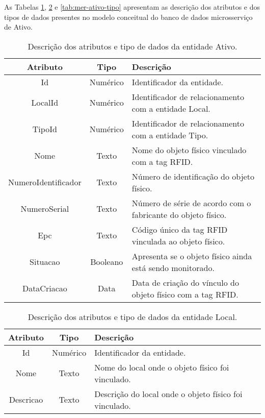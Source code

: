 \newpage

As Tabelas \ref{tab:mer-ativo}, \ref{tab:mer-ativo-local} e \ref{tab:mer-ativo-tipo} apresentam as descrição dos atributos e dos tipos de dados presentes no modelo conceitual do banco de dados microsserviço de Ativo.

\begin{table}[htb!]
\caption{Descrição dos atributos e tipo de dados da entidade Ativo.}
\label{tab:mer-ativo}
\begin{tabular}
{| c | c | p{9cm} |}
\hline 
\textbf{Atributo} & \textbf{Tipo} & \textbf{Descrição} \\ \hline
Id & Numérico & Identificador da entidade. \\ \hline
LocalId & Numérico & Identificador de relacionamento com a entidade Local. \\ \hline
TipoId & Numérico & Identificador de relacionamento com a entidade Tipo. \\ \hline
Nome & Texto & Nome do objeto físico vinculado com a tag \acrshort{RFID}. \\ \hline
NumeroIdentificador & Texto & Número de identificação do objeto físico. \\ \hline
NumeroSerial & Texto & Número de série de acordo com o fabricante do objeto físico. \\ \hline
Epc & Texto & Código único da tag \acrshort{RFID} vinculada ao objeto físico.\\ \hline
Situacao & Booleano & Apresenta se o objeto físico ainda está sendo monitorado. \\ \hline
DataCriacao & Data & Data de criação do vínculo do objeto físico com a tag \acrshort{RFID}. \\ \hline
\end{tabular}
\end{table}

\newpage

\begin{table}[htb!]
\caption{Descrição dos atributos e tipo de dados da entidade Local.}
\label{tab:mer-ativo-local}
\begin{tabular}
{| c | c | p{10.9cm} |}
\hline 
\textbf{Atributo} & \textbf{Tipo} & \textbf{Descrição} \\ \hline
Id & Numérico & Identificador da entidade. \\ \hline
Nome & Texto & Nome do local onde o objeto físico foi vinculado. \\ \hline
Descricao & Texto & Descrição do local onde o objeto físico foi vinculado. \\ \hline
\end{tabular}
\end{table}

